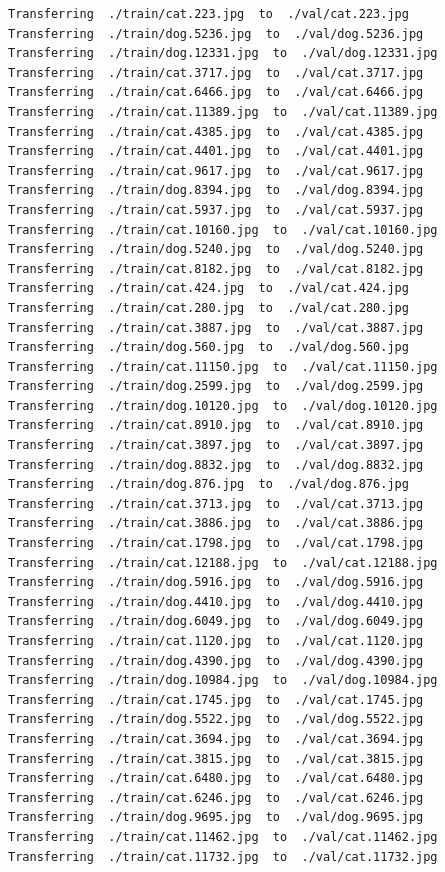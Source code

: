 \documentclass[]{book}
\theoremstyle{definition}
\theoremstyle{definition}
\theoremstyle{definition}
\theoremstyle{remark}
\begin{document}
\begin{verbatim}
Transferring  ./train/cat.223.jpg  to  ./val/cat.223.jpg
Transferring  ./train/dog.5236.jpg  to  ./val/dog.5236.jpg
Transferring  ./train/dog.12331.jpg  to  ./val/dog.12331.jpg
Transferring  ./train/cat.3717.jpg  to  ./val/cat.3717.jpg
Transferring  ./train/cat.6466.jpg  to  ./val/cat.6466.jpg
Transferring  ./train/cat.11389.jpg  to  ./val/cat.11389.jpg
Transferring  ./train/cat.4385.jpg  to  ./val/cat.4385.jpg
Transferring  ./train/cat.4401.jpg  to  ./val/cat.4401.jpg
Transferring  ./train/cat.9617.jpg  to  ./val/cat.9617.jpg
Transferring  ./train/dog.8394.jpg  to  ./val/dog.8394.jpg
Transferring  ./train/cat.5937.jpg  to  ./val/cat.5937.jpg
Transferring  ./train/cat.10160.jpg  to  ./val/cat.10160.jpg
Transferring  ./train/dog.5240.jpg  to  ./val/dog.5240.jpg
Transferring  ./train/cat.8182.jpg  to  ./val/cat.8182.jpg
Transferring  ./train/cat.424.jpg  to  ./val/cat.424.jpg
Transferring  ./train/cat.280.jpg  to  ./val/cat.280.jpg
Transferring  ./train/cat.3887.jpg  to  ./val/cat.3887.jpg
Transferring  ./train/dog.560.jpg  to  ./val/dog.560.jpg
Transferring  ./train/cat.11150.jpg  to  ./val/cat.11150.jpg
Transferring  ./train/dog.2599.jpg  to  ./val/dog.2599.jpg
Transferring  ./train/dog.10120.jpg  to  ./val/dog.10120.jpg
Transferring  ./train/cat.8910.jpg  to  ./val/cat.8910.jpg
Transferring  ./train/cat.3897.jpg  to  ./val/cat.3897.jpg
Transferring  ./train/dog.8832.jpg  to  ./val/dog.8832.jpg
Transferring  ./train/dog.876.jpg  to  ./val/dog.876.jpg
Transferring  ./train/cat.3713.jpg  to  ./val/cat.3713.jpg
Transferring  ./train/cat.3886.jpg  to  ./val/cat.3886.jpg
Transferring  ./train/cat.1798.jpg  to  ./val/cat.1798.jpg
Transferring  ./train/cat.12188.jpg  to  ./val/cat.12188.jpg
Transferring  ./train/dog.5916.jpg  to  ./val/dog.5916.jpg
Transferring  ./train/dog.4410.jpg  to  ./val/dog.4410.jpg
Transferring  ./train/dog.6049.jpg  to  ./val/dog.6049.jpg
Transferring  ./train/cat.1120.jpg  to  ./val/cat.1120.jpg
Transferring  ./train/dog.4390.jpg  to  ./val/dog.4390.jpg
Transferring  ./train/dog.10984.jpg  to  ./val/dog.10984.jpg
Transferring  ./train/cat.1745.jpg  to  ./val/cat.1745.jpg
Transferring  ./train/dog.5522.jpg  to  ./val/dog.5522.jpg
Transferring  ./train/cat.3694.jpg  to  ./val/cat.3694.jpg
Transferring  ./train/cat.3815.jpg  to  ./val/cat.3815.jpg
Transferring  ./train/cat.6480.jpg  to  ./val/cat.6480.jpg
Transferring  ./train/cat.6246.jpg  to  ./val/cat.6246.jpg
Transferring  ./train/dog.9695.jpg  to  ./val/dog.9695.jpg
Transferring  ./train/cat.11462.jpg  to  ./val/cat.11462.jpg
Transferring  ./train/cat.11732.jpg  to  ./val/cat.11732.jpg

\end{verbatim}
\end{document}
